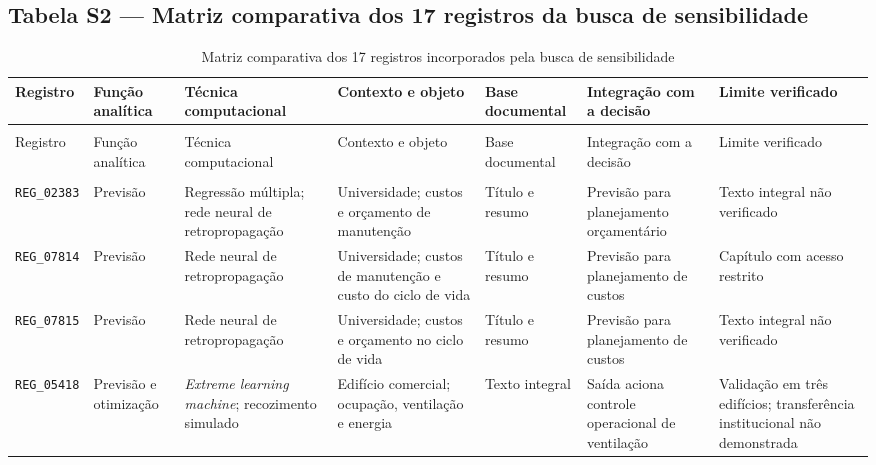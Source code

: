 \clearpage
\subsection*{Tabela S2 --- Matriz comparativa dos 17 registros da busca de sensibilidade}

\begin{landscape}
\setlength{\tabcolsep}{2pt}
\renewcommand{\arraystretch}{1.12}
\tiny
\begin{longtable}{>{\RaggedRight\arraybackslash}p{1.25cm} >{\RaggedRight\arraybackslash}p{2.35cm} >{\RaggedRight\arraybackslash}p{3.35cm} >{\RaggedRight\arraybackslash}p{3.0cm} >{\RaggedRight\arraybackslash}p{1.6cm} >{\RaggedRight\arraybackslash}p{5.0cm} >{\RaggedRight\arraybackslash}p{5.3cm}}
\caption{Matriz comparativa dos 17 registros incorporados pela busca de sensibilidade}\label{tab:s2}\\
\toprule
Registro & Função analítica & Técnica computacional & Contexto e objeto & Base documental & Integração com a decisão & Limite verificado \\
\midrule
\endfirsthead
\multicolumn{7}{c}{\tablename\ \thetable\ -- continuação}\\
\toprule
Registro & Função analítica & Técnica computacional & Contexto e objeto & Base documental & Integração com a decisão & Limite verificado \\
\midrule
\endhead
\midrule
\multicolumn{7}{r}{Continua na página seguinte}\\
\endfoot
\bottomrule
\endlastfoot
\texttt{REG\_02383} & Previsão & Regressão múltipla; rede neural de retropropagação & Universidade; custos e orçamento de manutenção & Título e resumo & Previsão para planejamento orçamentário & Texto integral não verificado \\
\texttt{REG\_07814} & Previsão & Rede neural de retropropagação & Universidade; custos de manutenção e custo do ciclo de vida & Título e resumo & Previsão para planejamento de custos & Capítulo com acesso restrito \\
\texttt{REG\_07815} & Previsão & Rede neural de retropropagação & Universidade; custos e orçamento no ciclo de vida & Título e resumo & Previsão para planejamento de custos & Texto integral não verificado \\
\texttt{REG\_05418} & Previsão e otimização & \textit{Extreme learning machine}; recozimento simulado & Edifício comercial; ocupação, ventilação e energia & Texto integral & Saída aciona controle operacional de ventilação & Validação em três edifícios; transferência institucional não demonstrada \\

\end{longtable}
\end{landscape}

